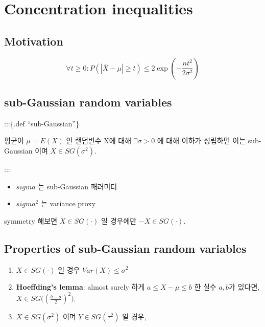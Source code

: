\documentclass[
]{book}
\providecommand{\tightlist}{%
  \setlength{\itemsep}{0pt}\setlength{\parskip}{0pt}}
\begin{document}
{{{\hypertarget{concentration-inequalities}{%
\section{Concentration inequalities}\label{concentration-inequalities}}

\hypertarget{motivation}{%
\subsection{Motivation}\label{motivation}}

\[
\forall t \ge 0 : P( | \bar X - \mu | \ge t) \le 2 \exp \left( - \frac{nt^2}{2\sigma^2}\right)
\]

\hypertarget{section}{%
\subsection{}\label{section}}

\hypertarget{sub-gaussian-random-variables}{%
\subsection{sub-Gaussian random variables}\label{sub-gaussian-random-variables}}

:::\{.def ``sub-Gaussian''\}

평균이 \(\mu = E(X)\) 인 랜덤변수 X에 대해 \(\exists \sigma >0\) 에 대해 이하가 성립하면 이는 sub-Gaussian 이며 \(X \in SG(\sigma^2)\).

:::

\begin{itemize}
\tightlist
\item
  \(sigma\) 는 sub-Gaussian 패러미터
\item
  \(sigma^2\) 는 variance proxy
\end{itemize}

symmetry 해보면 \(X \in SG(\cdot)\) 일 경우에만 \(-X \in SG(\cdot)\).

\hypertarget{properties-of-sub-gaussian-random-variables}{%
\subsection{Properties of sub-Gaussian random variables}\label{properties-of-sub-gaussian-random-variables}}

\begin{enumerate}
\def\labelenumi{\arabic{enumi}.}
\tightlist
\item
  \(X \in SG(\cdot)\) 일 경우 \(Var(X) \le \sigma^2\)
\item
  \textbf{Hoeffding's lemma}: almost surely 하게 \(a \le X-\mu \le b\) 한 실수 \(a, b\)가 있다면, \(X \in SG \Big ( (\frac{b-a}{2})^2\Big )\).
\item
  \(X \in SG(\sigma^2)\) 이며 \(Y \in SG(\tau^2)\) 일 경우,


\end{enumerate}}}}
\end{document}
